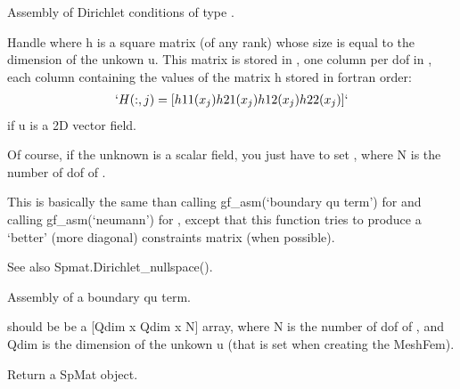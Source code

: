 \documentclass[a4paper,11pt,english]{sphinxmanual}
\begin{document}
\begin{fulllineitems}
\label{\detokenize{python/cmdref_Module asm:getfem.asm_dirichlet}}
Assembly of Dirichlet conditions of type .

Handle  where h is a square matrix (of any rank) whose
size is equal to the dimension of the unkown u. This matrix is
stored in , one column per dof in , each column containing
the values of the matrix h stored in fortran order:
\begin{equation*}
\begin{split}`H(:,j) = [h11(x_j) h21(x_j) h12(x_j) h22(x_j)]`\end{split}
\end{equation*}
if u is a 2D vector field.

Of course, if the unknown is a scalar field, you just have to set
, where N is the number of dof of .

This is basically the same than calling gf\_asm(‘boundary qu term’)
for  and calling gf\_asm(‘neumann’) for , except that this
function tries to produce a ‘better’ (more diagonal) constraints
matrix (when possible).

See also Spmat.Dirichlet\_nullspace().

\end{fulllineitems}


\begin{fulllineitems}
\label{\detokenize{python/cmdref_Module asm:getfem.asm_boundary_qu_term}}
Assembly of a boundary qu term.

 should be be a {[}Qdim x Qdim x N{]} array, where N is the number
of dof of , and Qdim is the dimension of the unkown u (that
is set when creating the MeshFem).

Return a SpMat object.

\end{fulllineitems}
\end{document}
